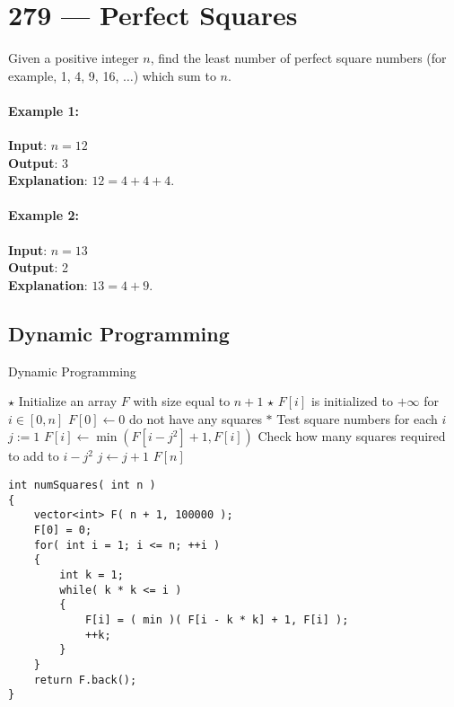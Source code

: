 \section{279 --- Perfect Squares}
Given a positive integer $n$, find the least number of perfect square numbers (for example, 1, 4, 9, 16, $\ldots$) which sum to $n$.

\paragraph{Example 1:}
\begin{flushleft}
\textbf{Input}: $n = 12$
\\
\textbf{Output}: 3 
\\
\textbf{Explanation}: $12 = 4 + 4 + 4$.
\end{flushleft}

\paragraph{Example 2:}
\begin{flushleft}
\textbf{Input}: $n = 13$
\\
\textbf{Output}: 2
\\
\textbf{Explanation}: $13 = 4 + 9$.
\end{flushleft}
\subsection{Dynamic Programming}

\setcounter{algorithm}{0}
\begin{algorithm}[H]
\caption{Dynamic Programming}
\begin{algorithmic}[1]
\State $\star$ Initialize an array $F$ with size equal to $n+1$
\State $\star$ $F[i]$ is initialized to $+\infty$ for $i\in[0,n]$
\State $F[0]\gets 0$  do not have any squares
\State $\ast$ Test square numbers for each $i$
\State $j:=1$
\State $F[i]\gets \min(F[i-j^2]+1, F[i])$ \Comment Check how many squares required to add to $i-j^2$
\State $j\gets j+1$
\EndWhile
\EndFor
\State \Return $F[n]$
\EndProcedure
\end{algorithmic}
\end{algorithm}

\setcounter{lstlisting}{0}
\begin{lstlisting}[style=customc, caption={DP}]
int numSquares( int n )
{
    vector<int> F( n + 1, 100000 );
    F[0] = 0;
    for( int i = 1; i <= n; ++i )
    {
        int k = 1;
        while( k * k <= i )
        {
            F[i] = ( min )( F[i - k * k] + 1, F[i] );
            ++k;
        }
    }
    return F.back();
}
\end{lstlisting}
